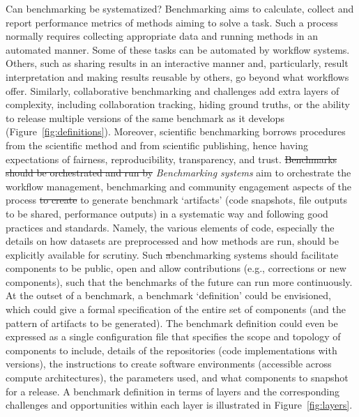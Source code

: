\documentclass[11pt]{article}
\begin{document}
Can benchmarking be systematized? {\color{red}Benchmarking aims to calculate, collect and report performance metrics of methods aiming to solve a task. Such a process normally requires collecting appropriate data and running methods in an automated manner. Some of these tasks can be automated by workflow systems. Others, such as sharing results in an interactive manner and, particularly, result interpretation and making results reusable by others, go beyond what workflows offer. Similarly, collaborative benchmarking and challenges add extra layers of complexity, including collaboration tracking, hiding ground truths, or the ability to release multiple versions of the same benchmark as it develops (Figure~\ref{fig:definitions}). Moreover, scientific benchmarking borrows procedures from the scientific method and from scientific publishing, hence having expectations of fairness, reproducibility, transparency, and trust. 
\sout{Benchmarks should be orchestrated and run by}} \emph{Benchmarking systems} {\color{red} aim to orchestrate the workflow management, benchmarking and community engagement aspects of the process  \sout{to create} to generate benchmark} `artifacts' (code snapshots, file outputs to be shared, performance outputs) {\color{red} in a systematic way and following good practices and standards. Namely,}  the various elements of code, especially the details on how datasets are preprocessed and how methods are run, should be explicitly available for scrutiny. Such {\color{red}\sout{a}benchmarking} systems should facilitate components to be public, open and allow contributions (e.g., corrections or new components), such that the benchmarks of the future can run more continuously. At the outset of a benchmark, a benchmark `definition' could be envisioned, which could give a formal specification of the entire set of components (and the pattern of artifacts to be generated). The benchmark definition could even be expressed as a single configuration file that specifies the scope and topology of components to include, details of the repositories (code implementations with versions), the instructions to create software environments (accessible across compute architectures), the parameters used, and what components to snapshot for a release. A benchmark definition in terms of layers and the corresponding challenges and opportunities within each layer is illustrated in Figure~\ref{fig:layers}.  
\end{document}
